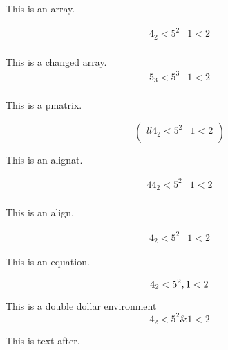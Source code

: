 \documentclass{article}
\begin{document}
This is an array.

\[
\begin{array}{ll}
 4_2  < 5^2 & 1 < 2 \\
\end{array}
\]

This is a changed array.
\[
\begin{array}{ll}
 5_3  < 5^3 & 1 < 2 \\
\end{array}
\]

This is a pmatrix.

\[
\begin{pmatrix}{ll}
 4_2  < 5^2 & 1 < 2 \\
\end{pmatrix}
\]

This is an alignat.

\begin{alignat}{4}
 4_2  < 5^2 & 1 < 2 \\
\end{alignat}

This is an align.


\begin{align}
 4_2  < 5^2 & 1 < 2 
\end{align}

This is an equation.

\begin{equation}
 4_2  < 5^2 , 1 < 2 \\
\end{equation}

This is a double dollar environment
$$
 4_2  < 5^2 \& 1 < 2 
$$

This is text after.
\end{document}
